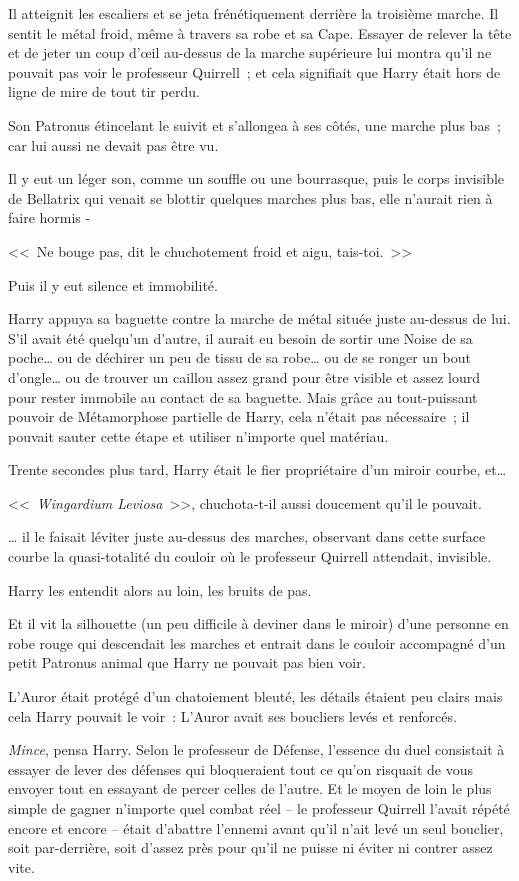 Il atteignit les escaliers et se jeta frénétiquement derrière la troisième marche. Il sentit le métal froid, même à travers sa robe et sa Cape. Essayer de relever la tête et de jeter un coup d'œil au-dessus de la marche supérieure lui montra qu'il ne pouvait pas voir le professeur Quirrell~; et cela signifiait que Harry était hors de ligne de mire de tout tir perdu.

Son Patronus étincelant le suivit et s'allongea à ses côtés, une marche plus bas~; car lui aussi ne devait pas être vu.

Il y eut un léger son, comme un souffle ou une bourrasque, puis le corps invisible de Bellatrix qui venait se blottir quelques marches plus bas, elle n'aurait rien à faire hormis -

<<~Ne bouge pas, dit le chuchotement froid et aigu, tais-toi.~>>

Puis il y eut silence et immobilité.

Harry appuya sa baguette contre la marche de métal située juste au-dessus de lui. S'il avait été quelqu'un d'autre, il aurait eu besoin de sortir une Noise de sa poche… ou de déchirer un peu de tissu de sa robe… ou de se ronger un bout d'ongle… ou de trouver un caillou assez grand pour être visible et assez lourd pour rester immobile au contact de sa baguette. Mais grâce au tout-puissant pouvoir de Métamorphose partielle de Harry, cela n'était pas nécessaire~; il pouvait sauter cette étape et utiliser n'importe quel matériau.

Trente secondes plus tard, Harry était le fier propriétaire d'un miroir courbe, et…

<<~\emph{Wingardium Leviosa}~>>, chuchota-t-il aussi doucement qu'il le pouvait.

… il le faisait léviter juste au-dessus des marches, observant dans cette surface courbe la quasi-totalité du couloir où le professeur Quirrell attendait, invisible.

Harry les entendit alors au loin, les bruits de pas.

Et il vit la silhouette (un peu difficile à deviner dans le miroir) d'une personne en robe rouge qui descendait les marches et entrait dans le couloir accompagné d'un petit Patronus animal que Harry ne pouvait pas bien voir.

L'Auror était protégé d'un chatoiement bleuté, les détails étaient peu clairs mais cela Harry pouvait le voir~: L'Auror avait ses boucliers levés et renforcés.

\emph{Mince}, pensa Harry. Selon le professeur de Défense, l'essence du duel consistait à essayer de lever des défenses qui bloqueraient tout ce qu'on risquait de vous envoyer tout en essayant de percer celles de l'autre. Et le moyen de loin le plus simple de gagner n'importe quel combat réel -- le professeur Quirrell l'avait répété encore et encore -- était d'abattre l'ennemi avant qu'il n'ait levé un seul bouclier, soit par-derrière, soit d'assez près pour qu'il ne puisse ni éviter ni contrer assez vite.

